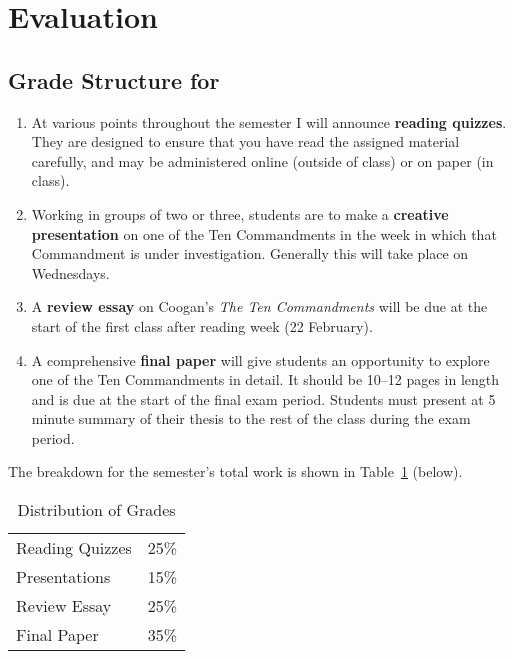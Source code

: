 \documentclass[titlepage]{article}
\begin{document}
\section{Evaluation}
\label{evaluation}

\subsection{Grade Structure for \ccode}
\label{structure}

\begin{enumerate}

	\item At various points throughout the semester I will announce
	\textbf{reading quizzes}. They are designed to ensure that you have
	read the assigned material carefully, and may be administered online
	(outside of class) or on paper (in class).

	\item Working in groups of two or three, students are to make a
	\textbf{creative presentation} on one of the Ten Commandments in the
	week in which that Commandment is under investigation. Generally
	this will take place on Wednesdays.

	\item A \textbf{review essay} on Coogan's \emph{The Ten
	Commandments} will be due at the start of the first class after
	reading week (22 February).

	\item A comprehensive \textbf{final paper} will give students an
	opportunity to explore one of the Ten Commandments in detail. It
	should be 10--12 pages in length and is due at the start of the
	final exam period. Students must present at 5 minute summary of
	their thesis to the rest of the class during the exam period.

\end{enumerate}

The breakdown for the semester's total work is shown in Table~\ref{distribution} (below).

\begin{table}[htbp]
  \centering
  {\lining
  \begin{tabular}{lr}
    \toprule
    Reading Quizzes & 25\% \\
    Presentations   & 15\% \\
    Review Essay    & 25\% \\
    Final Paper     & 35\% \\
    \bottomrule
  \end{tabular}}
  \caption{Distribution of Grades}
  \label{distribution}
\end{table}
\end{document}
